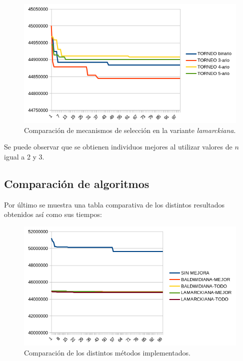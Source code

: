 	\begin{figure}[H]
	\centering
	\includegraphics[scale=0.9]{images/Lamarck/AGE-TORNEO.png} 
	\caption{Comparación de mecanismos de selección en la variante \textit{lamarckiana}.}
	\label{perc}
	\end{figure}
	
Se puede observar que se obtienen individuos mejores al utilizar valores de $n$ igual a 2 y 3.

\subsection{Comparación de algoritmos}

Por último se muestra una tabla comparativa de los distintos resultados obtenidos así como sus tiempos:

	\begin{figure}[H]
	\centering
	\includegraphics[scale=0.9]{images/AGcomp.png} 
	\caption{Comparación de los distintos métodos implementados.}
	\label{perc}
	\end{figure}
	
